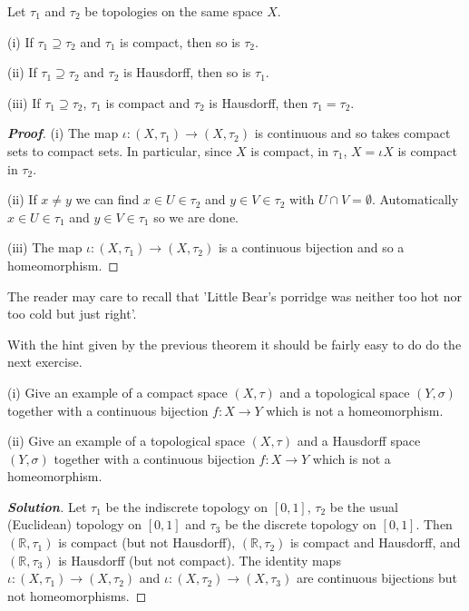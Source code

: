 \begin{theorem}\label{T;compare topologies}
Let $\tau_{1}$ and $\tau_{2}$ be topologies
on the same space $X$.

(i) If $\tau_{1}\supseteq \tau_{2}$ and $\tau_{1}$ is compact,
then so is $\tau_{2}$.

(ii) If $\tau_{1}\supseteq \tau_{2}$ and $\tau_{2}$ is Hausdorff,
then so is $\tau_{1}$.

(iii) If $\tau_{1}\supseteq \tau_{2}$, $\tau_{1}$ is compact
and $\tau_{2}$ is Hausdorff, then $\tau_{1}=\tau_{2}$.
\end{theorem}
\begin{proof}[\bf Proof] (i) The map $\iota:(X,{\tau}_{1})\rightarrow(X,{\tau}_{2})$
is continuous and so takes compact sets to compact sets. In particular,
since $X$ is compact, in $\tau_{1}$, $X=\iota X$ is compact in $\tau_{2}$.

(ii) If $x\neq y$ we can find $x\in U\in\tau_{2}$ and $y\in V\in\tau_{2}$
with $U\cap V=\emptyset$. Automatically 
$x\in U\in\tau_{1}$ and $y\in V\in\tau_{1}$ so we are done.

(iii) The map $\iota:(X,{\tau}_{1})\rightarrow(X,{\tau}_{2})$
is a continuous bijection and so a homeomorphism.
\end{proof}


The reader may care to
recall that 'Little Bear's porridge was neither too hot nor
too cold but just right'.

With the hint given by the previous theorem it should
be fairly easy to do do the next exercise.


\begin{theorem}\label{T;too hot}
(i) Give an example of a compact space $(X,\tau)$ and 
a topological space $(Y,\sigma)$
together with a continuous bijection $f:X\rightarrow Y$ 
which is not a homeomorphism.

(ii) Give an example of a topological space $(X,\tau)$ and 
a Hausdorff space $(Y,\sigma)$
together with a continuous bijection $f:X\rightarrow Y$ 
which is not a homeomorphism.
\end{theorem}
\begin{proof}[\bf Solution] Let $\tau_{1}$ be the 
indiscrete topology on $[0,1]$,
$\tau_{2}$ be the usual (Euclidean) topology on $[0,1]$
and $\tau_{3}$ be the discrete topology on $[0,1]$.
Then $({\mathbb R},\tau_{1})$ is compact (but not Hausdorff),
$({\mathbb R},\tau_{2})$ is compact and Hausdorff,
and $({\mathbb R},\tau_{3})$ is Hausdorff (but not compact).
The identity maps $\iota:(X,\tau_{1})\rightarrow(X,\tau_{2})$
and $\iota:(X,\tau_{2})\rightarrow(X,\tau_{3})$ are continuous
bijections but not homeomorphisms.
\end{proof}


